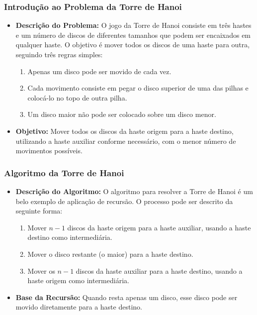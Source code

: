 \begin{frame}[fragile]
  \frametitle{Introdução ao Problema da Torre de Hanoi}
  \begin{itemize}
    \item \textbf{Descrição do Problema:} O jogo da Torre de Hanoi consiste em três hastes e um número de discos de diferentes tamanhos que podem ser encaixados em qualquer haste. O objetivo é mover todos os discos de uma haste para outra, seguindo três regras simples:
      \begin{enumerate}
        \item Apenas um disco pode ser movido de cada vez.
        \item Cada movimento consiste em pegar o disco superior de uma das pilhas e colocá-lo no topo de outra pilha.
        \item Um disco maior não pode ser colocado sobre um disco menor.
      \end{enumerate}
    \item \textbf{Objetivo:} Mover todos os discos da haste origem para a haste destino, utilizando a haste auxiliar conforme necessário, com o menor número de movimentos possíveis.
  \end{itemize}
\end{frame}

\begin{frame}[fragile]
  \frametitle{Algoritmo da Torre de Hanoi}
  \begin{itemize}
    \item \textbf{Descrição do Algoritmo:} O algoritmo para resolver a Torre de Hanoi é um belo exemplo de aplicação de recursão. O processo pode ser descrito da seguinte forma:
      \begin{enumerate}
        \item Mover \(n - 1\) discos da haste origem para a haste auxiliar, usando a haste destino como intermediária.
        \item Mover o disco restante (o maior) para a haste destino.
        \item Mover os \(n - 1\) discos da haste auxiliar para a haste destino, usando a haste origem como intermediária.
      \end{enumerate}
    \item \textbf{Base da Recursão:} Quando resta apenas um disco, esse disco pode ser movido diretamente para a haste destino.
  \end{itemize}
\end{frame}

